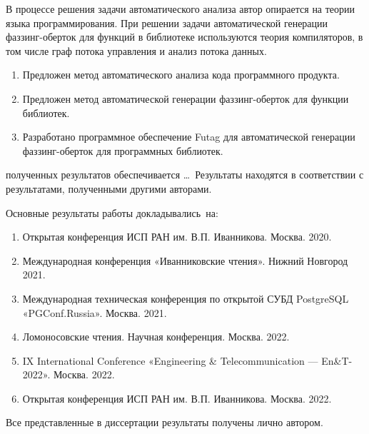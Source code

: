 {\methods} В процессе решения задачи автоматического анализа автор опирается на теории языка программирования. При решении задачи автоматической генерации фаззинг-оберток для функций в библиотеке используются теория компиляторов, в том числе граф потока управления и анализ потока данных.

{}
\begin{enumerate}[beginpenalty=10000] %
  \item Предложен метод автоматического анализа кода программного продукта.
  \item Предложен метод автоматической генерации фаззинг-оберток для функции библиотек.
  \item Разработано программное обеспечение Futag для автоматической генерации фаззинг-оберток для программных библиотек.
\end{enumerate}

{\reliability} полученных результатов обеспечивается \ldots \ Результаты находятся в соответствии с результатами, полученными другими авторами.

{\probation}
Основные результаты работы докладывались~на:
\begin{enumerate}[beginpenalty=10000] %
  \item Открытая конференция ИСП РАН им. В.П. Иванникова. Москва. 2020.
  \item Международная конференция «Иванниковские чтения». Нижний Новгород 2021.
  \item Международная техническая конференция по открытой СУБД PostgreSQL «PGConf.Russia». Москва. 2021.
  \item Ломоносовские чтения. Научная конференция. Москва. 2022.
  \item IX International Conference «Engineering \& Telecommunication — En\&T-2022». Москва. 2022.
  \item Открытая конференция ИСП РАН им. В.П. Иванникова. Москва. 2022.
\end{enumerate}

{\contribution} Все представленные в диссертации результаты получены лично автором.

